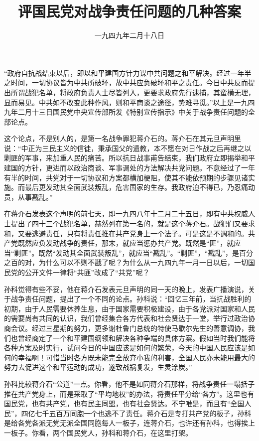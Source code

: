 
\title{评国民党对战争责任问题的几种答案}
\date{一九四九年二月十八日}
\maketitle


“政府自抗战结束以后，即以和平建国方针力谋中共问题之和平解决。经过一年半之时间，一切协议皆为中共所破坏，故中共应负破坏和平之责任。今日中共反而提出所谓战犯名单，将政府负责人士尽皆列入，更要求政府先行逮捕，其蛮横无理，显而易见。中共如不改变此种作风，则和平商谈之途径，势难寻觅。”以上是一九四九年二月十三日国民党中央宣传部所发《特别宣传指示》中关于战争责任问题的全部论点。

这个论点，不是别人的，是第一名战争罪犯蒋介石的。蒋介石在其元旦声明里说：“中正为三民主义的信徒，秉承国父的遗教，本不愿在对日作战之后再继之以剿匪的军事，来加重人民的痛苦。所以抗日战事甫告结束，我们政府立即揭举和平建国的方针，更进而以政治商谈、军事调处的方法解决共党问题。不意经过了一年有半的时间，共党对于一切协议和方案都横加梗阻，使其不能依预期的步骤见诸实施。而最后更发动其全面武装叛乱，危害国家的生存。我政府迫不得已，乃忍痛动员，从事戡乱。”

在蒋介石发表这个声明的前七天，即一九四八年十二月二十五日，即有中共权威人士提出了四十三个战犯名单，赫然列在第一名的，就是这个蒋介石。战犯们又要求和，又要逃避责任，只有将责任推在共产党身上一个法子。可是这是不调和的。共产党既然应负发动战争的责任，那末，就应当惩办共产党。既然是“匪”，就应当“剿匪”。既然“发动其全面武装叛乱”，就应当“戡乱”。“剿匪”，“戡乱”，是百分之百的对，为什么可以不剿不戡了呢？为什么从一九四九年一月一日以后，一切国民党的公开文件一律将“共匪”改成了“共党”呢？

孙科觉得有些不妥，他在蒋介石发表元旦声明的同一天的晚上，发表广播演说，关于战争责任问题，提出了一个不同的论点。孙科说：“回忆三年前，当抗战胜利的初期，由于人民需要休养生息，由于国家需要积极建设，由于各党派对国家和人民的需要尚有共同的认识，我们曾经集合各方代表和社会贤达于一堂，举行过政治协商会议。经过三星期的努力，更多谢杜鲁门总统的特使马歇尔先生的善意调协，我们也曾经商定了一个和平建国纲领和解决各种争端的具体方案。假如当时我们能将各种方案及时实行，试问今日的中国应该是如何的繁荣，今天的中国人民应该是如何的幸福啊！可惜当时各方既未能完全放弃小我的利害，全国人民亦未能用最大的努力去促进这个和平运动的成功，遂致战祸复发，生灵涂炭。”

孙科比较蒋介石“公道”一点。你看，他不是如同蒋介石那样，将战争责任一塌括子推在共产党身上，而是采取了“平均地权”的办法，将责任平分给“各方”。这里也有国民党，也有共产党，也有民主同盟，也有社会贤达。不宁唯是，而且有“全国人民”，四亿七千五百万同胞一个也逃不了责任。蒋介石是专打共产党的板子，孙科是给各党各派无党无派全国同胞每人一板子，连蒋介石，也许还有孙科，也得挨上一板子。你看，两个国民党人，孙科和蒋介石，在这里打架。

